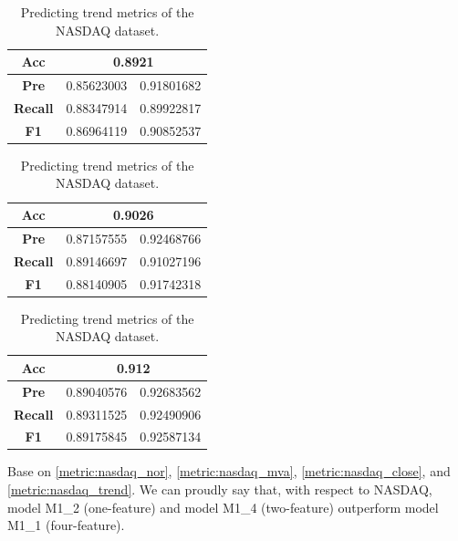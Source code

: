 \begin{table}[H]
	\centering
	\begin{minipage}{0.45\textwidth}
		\centering
		\begin{tabular}{|c|c|c|}
			\hline
			\textbf{Acc}    & \multicolumn{2}{c|}{0.8921} \\
			\hline
			\textbf{Pre}    & 0.85623003                 & 0.91801682 \\
			\hline
			\textbf{Recall} & 0.88347914                 & 0.89922817 \\
			\hline
			\textbf{F1}     & 0.86964119                 & 0.90852537 \\
			\hline
		\end{tabular}
	\end{minipage}
	\begin{minipage}{0.45\textwidth}
		\centering
		\begin{tabular}{|c|c|c|}
			\hline
			\textbf{Acc}    & \multicolumn{2}{c|}{0.9026} \\
			\hline
			\textbf{Pre}    & 0.87157555                 & 0.92468766 \\
			\hline
			\textbf{Recall} & 0.89146697                 & 0.91027196 \\
			\hline
			\textbf{F1}     & 0.88140905                 & 0.91742318 \\
			\hline
		\end{tabular}
	\end{minipage}
	\begin{minipage}{0.45\textwidth}
		\centering
		\begin{tabular}{|c|c|c|}
			\hline
			\textbf{Acc}    & \multicolumn{2}{c|}{0.912} \\
			\hline
			\textbf{Pre}    & 0.89040576                & 0.92683562 \\
			\hline
			\textbf{Recall} & 0.89311525                & 0.92490906 \\
			\hline
			\textbf{F1}     & 0.89175845                & 0.92587134 \\
			\hline
		\end{tabular}
	\end{minipage}
	\caption{Predicting trend metrics of the NASDAQ dataset.}
	\label{metric:nasdaq_trend}
\end{table}

Base on \autoref{metric:nasdaq_nor}, \autoref{metric:nasdaq_mva}, \autoref{metric:nasdaq_close},
and \autoref{metric:nasdaq_trend}. We can proudly say that, with respect to
NASDAQ, model M1\_2 (one-feature) and model M1\_4 (two-feature) outperform model M1\_1 (four-feature).

